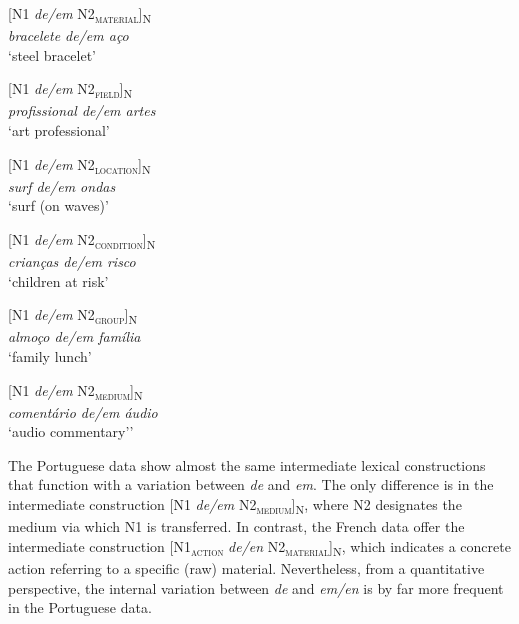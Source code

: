 \documentclass[output=paper]{langsci/langscibook}
\begin{document}
\begin{exe}\ex\begin{minipage}[t]{0.4\textwidth}    %
[N1 \textit{de/em} N2\textsubscript{\scshape material}]\textsubscript{N}\\
\textit{bracelete de/em aço}\\
`steel bracelet'
\end{minipage}\hfill%
\begin{minipage}[t]{0.45\textwidth}
[N1 \textit{de/em} N2\textsubscript{\scshape field}]\textsubscript{N}\\
\textit{profissional de/em artes}\\
`art professional'
\end{minipage}
\end{exe}

\begin{exe}\ex\begin{minipage}[t]{0.4\textwidth}    %
[N1 \textit{de/em} N2\textsubscript{\scshape location}]\textsubscript{N}\\
\textit{surf de/em ondas }\\
`surf (on waves)'
\end{minipage}\hfill            %
\begin{minipage}[t]{0.45\textwidth}
[N1 \textit{de/em} N2\textsubscript{\scshape condition}]\textsubscript{N}\\
\textit{crianças de/em risco}\\
`children at risk'
\end{minipage}\end{exe}

\begin{exe}\ex\begin{minipage}[t]{0.4\textwidth}    %
[N1 \textit{de/em} N2\textsubscript{\scshape group}]\textsubscript{N}\\
\textit{almoço de/em família}\\
`family lunch'
\end{minipage}\hfill%
\begin{minipage}[t]{0.45\textwidth}
[N1 \textit{de/em} N2\textsubscript{\scshape medium}]\textsubscript{N}\\
\textit{comentário de/em áudio}\\
`audio commentary’'
\end{minipage}\end{exe}

The Portuguese data show almost the same intermediate lexical constructions that function with a variation between \textit{de} and \textit{em}. The only difference is in the intermediate construction [N1 \textit{de/em} N2\textsubscript{\scshape medium}]\textsubscript{N}, where N2 designates the medium via which N1 is transferred. In contrast, the French data offer the intermediate construction [N1\textsubscript{\scshape action} \textit{de/en} N2\textsubscript{\scshape material}]\textsubscript{N}, which indicates a concrete action referring to a specific (raw) material. Nevertheless, from a quantitative perspective, the internal variation between \textit{de} and \textit{em/en} is by far more frequent in the Portuguese data.
\end{document}
